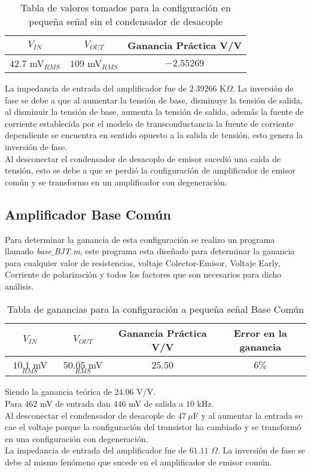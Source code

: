 \documentclass[11pt,graphicx,caption,rotating]{article}
\begin{document}
\begin{table}[H]
	\centering
\begin{tabular}[c]{|c|c|c|} \hline
$V_{IN}$ & $V_{OUT}$ & \textbf{Ganancia Práctica} V/V \\ \hline
$42.7$ mV$_{RMS}$ & $109$ mV$_{RMS}$ & $-2.55269$ \\ \hline
\end{tabular}
	\caption{Tabla de valores tomados para la configuración en pequeña señal sin el condensador de desacople}
	\label{tab4}
\end{table}
\noindent
La impedancia de entrada del amplificador fue de $2.39266$ K$\Omega$. La inversión de fase se debe a que al aumentar la tensión de base, disminuye la tensión de salida, al disminuir la tensión de base, aumenta la tensión de salida, además la fuente de corriente establecida por el modelo de transconductancia la fuente de corriente dependiente se encuentra en sentido opuesto a la salida de tensión, esto genera la inversión de fase.\\
Al desconectar el condensador de desacoplo de emisor sucedió una caída de tensión, esto se debe a que se perdió la configuración de amplificador de emisor común y se transformo en un amplificador con degeneración.

\subsection{Amplificador Base Común}
\noindent
Para determinar la ganancia de esta configuración se realizo un programa llamado \textit{base$\_$BJT.m}, este programa esta diseñado para determinar la ganancia para cualquier valor de resistencias, voltaje Colector-Emisor, Voltaje Early, Corriente de polarización y todos los factores que son necesarios para dicho análisis.
\begin{table}[H]
	\centering
\begin{tabular}[c]{|c|c|c|c|} \hline
$V_{IN}$ & $V_{OUT}$ & \textbf{Ganancia Práctica} V/V & \textbf{Error en la ganancia} \\ \hline
$10.1$ mV$_{RMS}$ & $50.05$ mV$_{RMS}$ & $25.50$ & $6\%$ \\
 \hline
\end{tabular}
	\caption{Tabla de ganancias para la configuración a pequeña señal Base Común}
	\label{tab5}
\end{table}
\noindent
Siendo la ganancia teórica de $24.06$ V/V.\\
Para $462$ mV de entrada dan $446$ mV de salida a $10$ kHz.\\
Al desconectar el condensador de desacople de $47\ \mu$F y al aumentar la entrada se cae el voltaje porque la configuración del transistor ha cambiado y se transformó en una configuración con degeneración.\\
La impedancia de entrada del amplificador fue de $61.11$ $\Omega$. La inversión de fase se debe al mismo fenómeno que sucede en el amplificador de emisor común.\\
\end{document}
